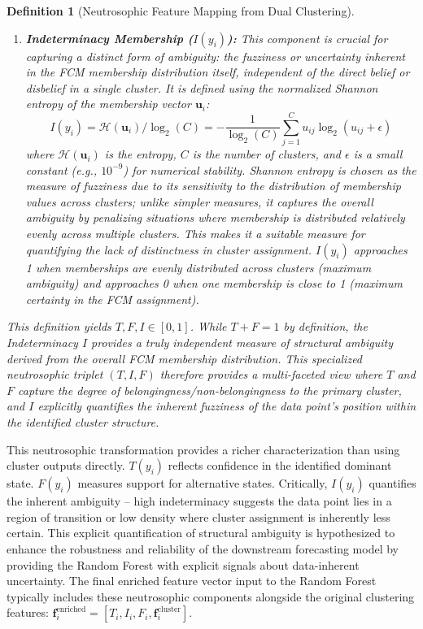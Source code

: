 \documentclass[review,3p,times]{elsarticle}
\newtheorem{definition}{Definition}[section]
\begin{document}
\begin{definition}[Neutrosophic Feature Mapping from Dual Clustering]
\begin{enumerate}
    \item \textbf{Indeterminacy Membership ($I(y_i)$):} This component is crucial for capturing a distinct form of ambiguity: the fuzziness or uncertainty inherent in the FCM membership distribution itself, independent of the direct belief or disbelief in a single cluster. It is defined using the normalized Shannon entropy of the membership vector $\mathbf{u}_i$:
    \begin{equation}
        \label{eq:indeterminacy_revised}
        I(y_i) = \mathcal{H}(\mathbf{u}_i) / \log_2(C) = -\frac{1}{\log_2(C)} \sum_{j=1}^{C} u_{ij} \log_2(u_{ij} + \epsilon)
    \end{equation}
    where $\mathcal{H}(\mathbf{u}_i)$ is the entropy, $C$ is the number of clusters, and $\epsilon$ is a small constant (e.g., $10^{-9}$) for numerical stability. Shannon entropy is chosen as the measure of fuzziness due to its sensitivity to the distribution of membership values across clusters; unlike simpler measures, it captures the overall ambiguity by penalizing situations where membership is distributed relatively evenly across multiple clusters. This makes it a suitable measure for quantifying the lack of distinctness in cluster assignment. $I(y_i)$ approaches 1 when memberships are evenly distributed across clusters (maximum ambiguity) and approaches 0 when one membership is close to 1 (maximum certainty in the FCM assignment).
\end{enumerate}
This definition yields $T, F, I \in [0,1]$. While $T+F=1$ by definition, the Indeterminacy $I$ provides a truly independent measure of structural ambiguity derived from the overall FCM membership distribution. This specialized neutrosophic triplet $(T, I, F)$ therefore provides a multi-faceted view where $T$ and $F$ capture the degree of belongingness/non-belongingness to the primary cluster, and $I$ explicitly quantifies the inherent fuzziness of the data point's position within the identified cluster structure.
\end{definition}

This neutrosophic transformation provides a richer characterization than using cluster outputs directly. $T(y_i)$ reflects confidence in the identified dominant state. $F(y_i)$ measures support for alternative states. Critically, $I(y_i)$ quantifies the inherent ambiguity – high indeterminacy suggests the data point lies in a region of transition or low density where cluster assignment is inherently less certain. This explicit quantification of structural ambiguity is hypothesized to enhance the robustness and reliability of the downstream forecasting model by providing the Random Forest with explicit signals about data-inherent uncertainty. The final enriched feature vector input to the Random Forest typically includes these neutrosophic components alongside the original clustering features: $\mathbf{f}_i^{\text{enriched}} = [T_i, I_i, F_i, \mathbf{f}_i^{\text{cluster}}]$.
\end{document}

